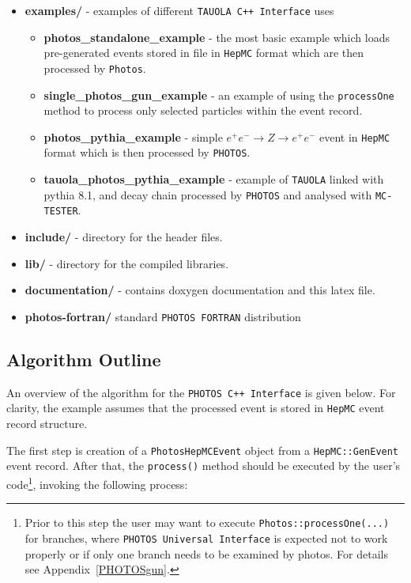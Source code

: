 \documentclass[]{Photos_interface_design}
\begin{document}
\begin{itemize}
  \item {\bf examples/ } - examples of different {\tt TAUOLA C++ Interface} uses
    \begin{itemize}
	\item {\bf photos\_standalone\_example} - the most basic example which loads pre-generated 
	      events stored in file in {\tt HepMC} format which are then processed by {\tt Photos}.
	\item {\bf single\_photos\_gun\_example} - an example of using the {\tt processOne} method
	      to process only selected particles within the event record.
    \item {\bf photos\_pythia\_example} - simple $e^+e^- \rightarrow Z \rightarrow e^+e^-$ event in
	{\tt HepMC} format which is then processed by {\tt PHOTOS}.
    \item {\bf tauola\_photos\_pythia\_example } - example of  {\tt TAUOLA} linked with pythia 8.1,
	and decay chain processed by {\tt PHOTOS} and analysed with  {\tt MC-TESTER}.
    \end{itemize}   
  \item {\bf include/} - directory for the header files.
  \item {\bf lib/ } - directory for the compiled  libraries. 
  \item {\bf documentation/ } - contains doxygen documentation and this latex file.
  \item {\bf photos-fortran/ } standard {\tt PHOTOS FORTRAN} distribution
\end{itemize}

\subsection{Algorithm Outline}
\label{sect:Outline}

An overview of the algorithm for  the {\tt PHOTOS C++ Interface} is
given below. For clarity, the example assumes that the processed event
is stored in {\tt HepMC} event record structure.

The first step is creation of a {\tt PhotosHepMCEvent} object from
a {\tt HepMC::GenEvent} event record. After that, the {\tt process()} method should
be executed by the user's code\footnote{Prior to this step
the user may want to execute {\tt Photos::processOne(...)} for branches,
where {\tt PHOTOS Universal Interface} is expected not to work properly
or if only one branch needs to be examined by photos. For details see Appendix~\ref{PHOTOSgun}.
}, invoking the following process:
\end{document}

